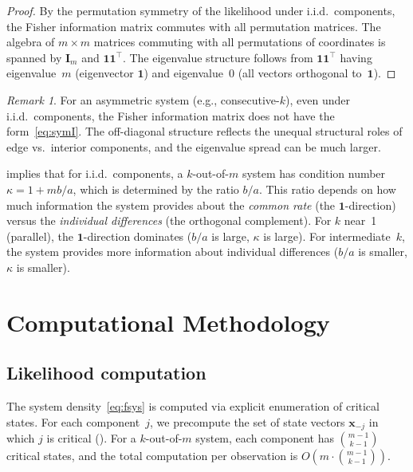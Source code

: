 \documentclass[12pt]{article}
\theoremstyle{definition}
\theoremstyle{remark}
\newtheorem{remark}[theorem]{Remark}
\newcommand{\bone}{\mathbf{1}}
\begin{document}
\begin{proof}
  By the permutation symmetry of the likelihood under i.i.d.\
  components, the Fisher information matrix commutes with all
  permutation matrices.  The algebra of $m \times m$ matrices
  commuting with all permutations of coordinates is spanned by
  $\mathbf{I}_m$ and $\bone\bone^\top$.  The eigenvalue structure
  follows from $\bone\bone^\top$ having eigenvalue~$m$ (eigenvector
  $\bone$) and eigenvalue~0 (all vectors orthogonal to~$\bone$).
\end{proof}

\begin{remark}
  For an asymmetric system (e.g., consecutive-$k$), even under i.i.d.\
  components, the Fisher information matrix does not have the
  form~\eqref{eq:symI}.  The off-diagonal structure reflects the
  unequal structural roles of edge vs.\ interior components, and the
  eigenvalue spread can be much larger.
\end{remark}

 implies that for i.i.d.\ components, a
$k$-out-of-$m$ system has condition number
$\kappa = 1 + mb/a$, which is determined by the ratio $b/a$.  This
ratio depends on how much information the system provides about the
\emph{common rate} (the $\bone$-direction) versus the
\emph{individual differences} (the orthogonal complement).  For $k$
near~1 (parallel), the $\bone$-direction dominates ($b/a$ is large,
$\kappa$ is large).  For intermediate~$k$, the system provides more
information about individual differences ($b/a$ is smaller, $\kappa$
is smaller).


\section{Computational Methodology}
\label{sec:method}

\subsection{Likelihood computation}
\label{sec:likelihood}

The system density~\eqref{eq:fsys} is computed via explicit
enumeration of critical states.  For each component~$j$, we
precompute the set of state vectors $\mathbf{x}_{-j}$ in which $j$ is
critical (\Cref{def:coherent}).  For a $k$-out-of-$m$ system,
each component has $\binom{m-1}{k-1}$ critical states,
and the total computation per observation is
$O(m \cdot \binom{m-1}{k-1})$.
\end{document}
